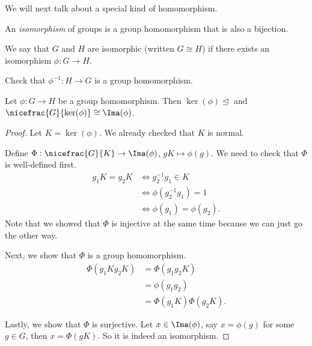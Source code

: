 We will next talk about a special kind of homomorphism.
\begin{definition}
    An \textit{isomorphism} of groups is a group homomorphism that is also a bijection.

    We say that \(G\) and \(H\) are isomorphic (written \(G\cong H\)) if there exists an isomorphism \(\phi: G \to H\).
\end{definition}

\begin{exercise}
    Check that \(\phi^{-1}: H\to G\) is a group homomorphism.
\end{exercise}

\begin{theorem}
    Let \(\phi:G\to H\) be a group homomorphism. Then \(\ker(\phi)\trianglelefteq\) and \(\nicefrac{G}{\ker(\phi)}\cong \Ima(\phi)\).
\end{theorem}
\begin{proof}
    Let \(K = \ker(\phi)\). We already checked that \(K\) is normal.

    Define \(\Phi: \nicefrac{G}{K}\to \Ima(\phi)\), \(gK\mapsto\phi(g)\). We need to check that \(\Phi\) is well-defined first.
    \begin{align*}
        g_1 K = g_2 K &\iff g_2^{-1}g_1 \in K\\
        &\iff  \phi(g_2^{-1}g_1) = 1\\
        &\iff  \phi(g_1) = \phi(g_2).
    \end{align*}
    Note that we showed that \(\Phi\) is injective at the same time because we can just go the other way.

    Next, we show that \(\Phi\) is a group homomorphism.
    \begin{align*}
        \Phi(g_{1}Kg_{2}K) &= \Phi(g_1 g_2 K)\\
        &=\phi(g_1 g_2)\\
        &=\Phi(g_1 K)\Phi(g_2 K).
    \end{align*}

    Lastly, we show that \(\Phi\) is surjective. Let \(x \in \Ima (\phi)\), say \(x = \phi(g)\) for some \(g \in G\), then \(x = \Phi(gK)\). So it is indeed an isomorphism.
\end{proof}

